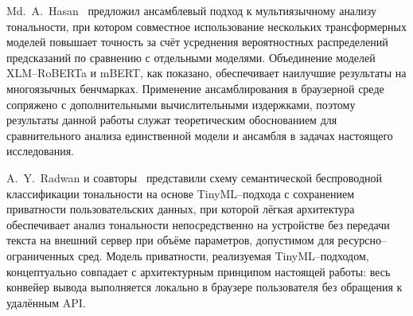 Md.~A.~Hasan~\cite{hasan2024ensemble} предложил ансамблевый подход к мультиязычному анализу тональности, при котором совместное использование нескольких трансформерных моделей повышает точность за счёт усреднения вероятностных распределений предсказаний по сравнению с отдельными моделями. Объединение моделей XLM–RoBERTa и mBERT, как показано, обеспечивает наилучшие результаты на многоязычных бенчмарках. Применение ансамблирования в браузерной среде сопряжено с дополнительными вычислительными издержками, поэтому результаты данной работы служат теоретическим обоснованием для сравнительного анализа единственной модели и ансамбля в задачах настоящего исследования.
 
A.~Y.~Radwan и соавторы~\cite{radwan2024tinymlnlp} представили схему семантической беспроводной классификации тональности на основе TinyML–подхода с сохранением приватности пользовательских данных, при которой лёгкая архитектура обеспечивает анализ тональности непосредственно на устройстве без передачи текста на внешний сервер при объёме параметров, допустимом для ресурсно–ограниченных сред. Модель приватности, реализуемая TinyML–подходом, концептуально совпадает с архитектурным принципом настоящей работы: весь конвейер вывода выполняется локально в браузере пользователя без обращения к удалённым API.